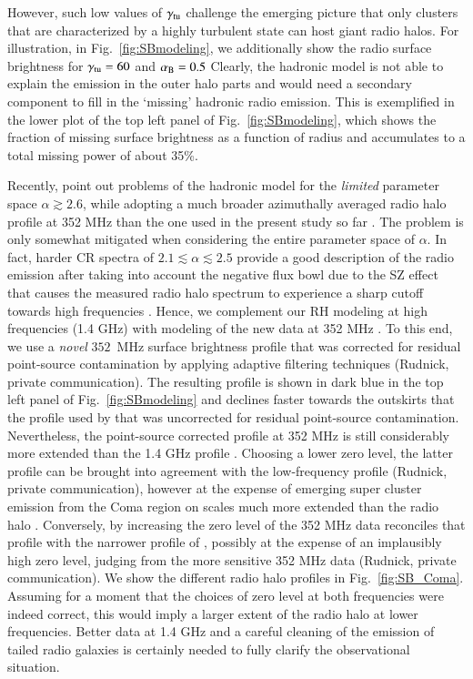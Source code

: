 \documentclass[useAMS,usenatbib]{mn2e}
\begin{document}
However, such low values of $\gamma_{{\mathrm{tu}}}$ challenge the emerging picture
that only clusters that are characterized by a highly turbulent state can host
giant radio halos. For illustration, in Fig.~\ref{fig:SBmodeling}, we
additionally show the radio surface brightness for $\gamma_{{\mathrm{tu}}} = 60$ and
$\alpha_{{\mathrm{B}}}=0.5$ Clearly, the hadronic model is not able to explain the
emission in the outer halo parts and would need a secondary component to fill in
the `missing' hadronic radio emission.  This is exemplified in the lower plot of
the top left panel of Fig.~\ref{fig:SBmodeling}, which shows the fraction of
missing surface brightness as a function of radius and accumulates to a total
missing power of about 35\%.

Recently, \citet{2012arXiv1207.3025B} point out problems of the hadronic model
for the {\em limited} parameter space $\alpha\gtrsim2.6$, while adopting a much
broader azimuthally averaged radio halo profile at 352 MHz
\citep{2011MNRAS.412....2B} than the one used in the present study so far
\citep{1997A&A...321...55D}. The problem is only somewhat mitigated when
considering the entire parameter space of $\alpha$. In fact, harder CR spectra
of $2.1\lesssim \alpha\lesssim2.5$ provide a good description of the radio
emission after taking into account the negative flux bowl due to the SZ effect
that causes the measured radio halo spectrum to experience a sharp cutoff
towards high frequencies \citep{2004A&A...413...17P}. Hence, we complement our
RH modeling at high frequencies (1.4 GHz) with modeling of the new data at 352
MHz \citep{2011MNRAS.412....2B}. To this end, we use a {\em novel} $352$~MHz
surface brightness profile that was corrected for residual point-source
contamination by applying adaptive filtering techniques (Rudnick, private
communication). The resulting profile is shown in dark blue in the top left
panel of Fig.~\ref{fig:SBmodeling} and declines faster towards the outskirts
that the profile used by \citet{2012arXiv1207.3025B} that was uncorrected for
residual point-source contamination. Nevertheless, the point-source corrected
profile at 352 MHz \citep{2011MNRAS.412....2B} is still considerably more
extended than the 1.4 GHz profile \citep{1997A&A...321...55D}. Choosing a lower
zero level, the latter profile can be brought into agreement with the
low-frequency profile (Rudnick, private communication), however at the expense
of emerging super cluster emission from the Coma region on scales much more
extended than the radio halo \citep{2007ApJ...659..267K}. Conversely, by
increasing the zero level of the 352 MHz data \citep{2011MNRAS.412....2B}
reconciles that profile with the narrower profile of
\citet{1997A&A...321...55D}, possibly at the expense of an implausibly high
zero level, judging from the more sensitive 352 MHz data (Rudnick, private
communication). We show the different radio halo profiles in
Fig.~\ref{fig:SB_Coma}.  Assuming for a moment that the choices of zero
level at both frequencies were indeed correct, this would imply a larger extent
of the radio halo at lower frequencies.  Better data at 1.4 GHz and a careful
cleaning of the emission of tailed radio galaxies is certainly needed to fully
clarify the observational situation.
\end{document}
